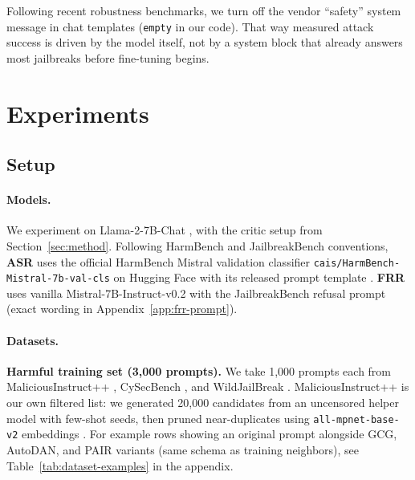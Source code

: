 \documentclass{article}
\begin{document}
Following recent robustness benchmarks, we turn off the vendor ``safety'' system message in chat templates (\texttt{empty} in our code). That way measured attack success is driven by the model itself, not by a system block that already answers most jailbreaks before fine-tuning begins.


\section{Experiments}
\label{sec:experiments}

\subsection{Setup}
\label{sec:exp-setup}

\paragraph{Models.}
We experiment on Llama-2-7B-Chat \citep{touvron2023llama2}, with the critic setup from Section~\ref{sec:method}. Following HarmBench and JailbreakBench conventions, \textbf{ASR} uses the official HarmBench Mistral validation classifier \texttt{cais/HarmBench-Mistral-7b-val-cls} on Hugging Face with its released prompt template \citep{mazeika2024harmbench}. \textbf{FRR} uses vanilla Mistral-7B-Instruct-v0.2 \citep{jiang2023mistral} with the JailbreakBench refusal prompt \citep{chao2024jailbreakbench} (exact wording in Appendix~\ref{app:frr-prompt}).

\paragraph{Datasets.}
\textbf{Harmful training set (3{,}000 prompts).} We take 1{,}000 prompts each from MaliciousInstruct++ \citep{huang2023maliciousinstruct}, CySecBench \citep{cysecbench2025}, and WildJailBreak \citep{jiang2024wildjailbreak}. MaliciousInstruct++ is our own filtered list: we generated 20{,}000 candidates from an uncensored helper model with few-shot seeds, then pruned near-duplicates using \texttt{all-mpnet-base-v2} embeddings \citep{reimers2019sbert}. For example rows showing an original prompt alongside GCG, AutoDAN, and PAIR variants (same schema as training neighbors), see Table~\ref{tab:dataset-examples} in the appendix.
\end{document}
